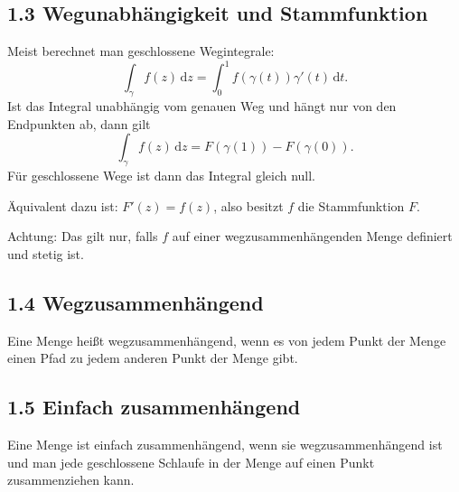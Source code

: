 \documentclass[11pt,a4paper]{article}
\newcommand{\dd}{\,\mathrm d}
\begin{document}
\subsection{1.3 Wegunabhängigkeit und Stammfunktion}
Meist berechnet man geschlossene Wegintegrale:
\[
\int_\gamma f(z)\dd z=\int_0^1 f(\gamma(t))\gamma'(t)\dd t.
\]
Ist das Integral unabhängig vom genauen Weg und hängt nur von den Endpunkten ab, dann gilt
\[
\int_\gamma f(z)\dd z=F(\gamma(1))-F(\gamma(0)).
\]
Für geschlossene Wege ist dann das Integral gleich null.

\begin{importantbox}
Äquivalent dazu ist: $F'(z)=f(z)$, also besitzt $f$ die Stammfunktion $F$.
\end{importantbox}

Achtung: Das gilt nur, falls $f$ auf einer wegzusammenhängenden Menge definiert und stetig ist.

\subsection{1.4 Wegzusammenhängend}
\begin{importantbox}
Eine Menge heißt wegzusammenhängend, wenn es von jedem Punkt der Menge einen Pfad zu jedem anderen Punkt der Menge gibt.
\end{importantbox}

\begin{center}
\end{center}

\subsection{1.5 Einfach zusammenhängend}
\begin{importantbox}
Eine Menge ist einfach zusammenhängend, wenn sie wegzusammenhängend ist und man jede geschlossene Schlaufe in der Menge auf einen Punkt zusammenziehen kann.
\end{importantbox}
\end{document}

